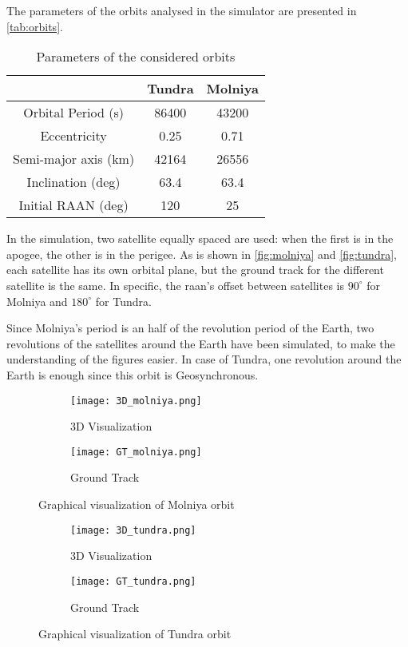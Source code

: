 The parameters of the orbits analysed in the simulator are presented in \autoref{tab:orbits}.

\begin{table}[ht]
	\centering
	\begin{tabular}{ccc}
	\toprule
	& Tundra & Molniya\\
	\midrule
	Orbital Period (s)     & 86400   & 43200\\
	Eccentricity        & 0.25   & 0.71\\
	Semi-major axis (km) & 42164 & 26556\\
	Inclination (deg)      & 63.4 & 63.4\\
	Initial RAAN (deg)	& 120	& 25\\
	\bottomrule
	\end{tabular}
	\caption{Parameters of the considered orbits}
	\label{tab:orbits}
\end{table}

In the simulation, two satellite equally spaced are used: when the first is in the apogee, the other is in the perigee.
As is shown in \autoref{fig:molniya} and \autoref{fig:tundra}, each satellite has its own orbital plane, but the ground track for the different satellite is the same.
In specific, the \gls{raan}'s offset between satellites is $90^\circ$ for Molniya and $180^\circ$ for Tundra.

Since Molniya's period is an half of the revolution period of the Earth, two revolutions of the satellites around the Earth have been simulated, to make the understanding of the figures easier.
In case of Tundra, one revolution around the Earth is enough since this orbit is Geosynchronous.

\begin{figure}[!htbp]
	\begin{subfigure}{.5\textwidth}
	\centering
	\texttt{[image: 3D\_molniya.png]}
	\caption{3D Visualization}
	\label{fig:3D_molniya}
	\end{subfigure}
	\begin{subfigure}{.5\textwidth}
	\centering
	\texttt{[image: GT\_molniya.png]}
	\caption{Ground Track}
	\label{fig:GT_molniya}
	\end{subfigure}
	\caption{Graphical visualization of Molniya orbit}
	\label{fig:molniya}
\end{figure}

\begin{figure}[!htbp]
	\begin{subfigure}{.5\textwidth}
	\centering
	\texttt{[image: 3D\_tundra.png]}
	\caption{3D Visualization}
	\label{fig:3D_tundra}
	\end{subfigure}
	\begin{subfigure}{.5\textwidth}
	\centering
	\texttt{[image: GT\_tundra.png]}
	\caption{Ground Track}
	\label{fig:GT_tundra}
	\end{subfigure}
	\caption{Graphical visualization of Tundra orbit}
	\label{fig:tundra}
\end{figure}

